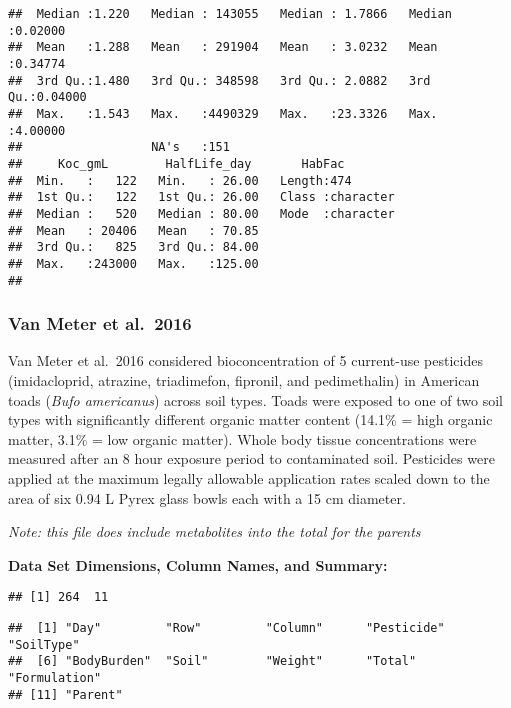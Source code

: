 \documentclass[
]{article}
\begin{document}
\begin{verbatim}
##  Median :1.220   Median : 143055   Median : 1.7866   Median :0.02000  
##  Mean   :1.288   Mean   : 291904   Mean   : 3.0232   Mean   :0.34774  
##  3rd Qu.:1.480   3rd Qu.: 348598   3rd Qu.: 2.0882   3rd Qu.:0.04000  
##  Max.   :1.543   Max.   :4490329   Max.   :23.3326   Max.   :4.00000  
##                  NA's   :151                                          
##     Koc_gmL        HalfLife_day       HabFac         
##  Min.   :   122   Min.   : 26.00   Length:474        
##  1st Qu.:   122   1st Qu.: 26.00   Class :character  
##  Median :   520   Median : 80.00   Mode  :character  
##  Mean   : 20406   Mean   : 70.85                     
##  3rd Qu.:   825   3rd Qu.: 84.00                     
##  Max.   :243000   Max.   :125.00                     
## 
\end{verbatim}

\hypertarget{van-meter-et-al.-2016}{%
\subsubsection{Van Meter et al.~2016}\label{van-meter-et-al.-2016}}

Van Meter et al.~2016 considered bioconcentration of 5 current-use
pesticides (imidacloprid, atrazine, triadimefon, fipronil, and
pedimethalin) in American toads (\emph{Bufo americanus}) across soil
types. Toads were exposed to one of two soil types with significantly
different organic matter content (14.1\% = high organic matter, 3.1\% =
low organic matter). Whole body tissue concentrations were measured
after an 8 hour exposure period to contaminated soil. Pesticides were
applied at the maximum legally allowable application rates scaled down
to the area of six 0.94 L Pyrex glass bowls each with a 15 cm diameter.

\emph{Note: this file does include metabolites into the total for the
parents}

\textbf{Data Set Dimensions, Column Names, and Summary:}

\begin{verbatim}
## [1] 264  11
\end{verbatim}

\begin{verbatim}
##  [1] "Day"         "Row"         "Column"      "Pesticide"   "SoilType"   
##  [6] "BodyBurden"  "Soil"        "Weight"      "Total"       "Formulation"
## [11] "Parent"
\end{verbatim}
\end{document}
